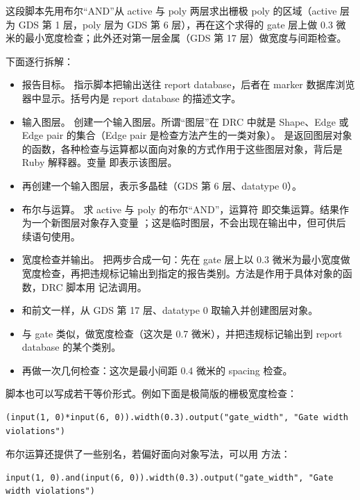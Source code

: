 这段脚本先用布尔“AND”从 active 与 poly 两层求出栅极 poly 的区域（active 层为 GDS 第 1 层，poly 层为 GDS 第 6 层），再在这个求得的 gate 层上做 0.3 微米的最小宽度检查；此外还对第一层金属（GDS 第 17 层）做宽度与间距检查。

下面逐行拆解：

\begin{itemize}
\item 报告目标。 指示脚本把输出送往 report database，后者在 marker 数据库浏览器中显示。括号内是 report database 的描述文字。
\item 输入图层。 创建一个输入图层。所谓“图层”在 DRC 中就是 Shape、Edge 或 Edge pair 的集合（Edge pair 是检查方法产生的一类对象）。 是返回图层对象的函数，各种检查与运算都以面向对象的方式作用于这些图层对象，背后是 Ruby 解释器。变量  即表示该图层。
\item {} 再创建一个输入图层，表示多晶硅（GDS 第 6 层、datatype 0）。
\item 布尔与运算。 求 active 与 poly 的布尔“AND”，运算符 \ui{\&} 即交集运算。结果作为一个新图层对象存入变量 ；这是临时图层，不会出现在输出中，但可供后续语句使用。
\item 宽度检查并输出。 把两步合成一句：先在 gate 层上以 0.3 微米为最小宽度做宽度检查，再把违规标记输出到指定的报告类别。方法是作用于具体对象的函数，DRC 脚本用  记法调用。
\item {} 和前文一样，从 GDS 第 17 层、datatype 0 取输入并创建图层对象。
\item {} 与 gate 类似，做宽度检查（这次是 0.7 微米），并把违规标记输出到 report database 的某个类别。
\item {} 再做一次几何检查：这次是最小间距 0.4 微米的 spacing 检查。
\end{itemize}

脚本也可以写成若干等价形式。例如下面是极简版的栅极宽度检查：

\begin{lstlisting}
(input(1, 0)*input(6, 0)).width(0.3).output("gate_width", "Gate width violations")
\end{lstlisting}

布尔运算还提供了一些别名，若偏好面向对象写法，可以用  方法：

\begin{lstlisting}
input(1, 0).and(input(6, 0)).width(0.3).output("gate_width", "Gate width violations")
\end{lstlisting}


